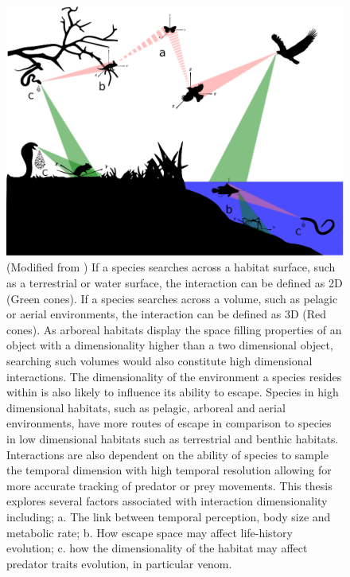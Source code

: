 \begin{figure}[!Hpc]
  \centering
  \includegraphics[keepaspectratio=true, width=1.0\textwidth,left]{ch1-introduction/fig_into.eps}\hspace*{10cm}
  \caption[ ]{(Modified from \cite{pawar2012dimensionality}) If a species searches across a habitat surface, such as a terrestrial or water surface, the interaction can be defined as 2D (Green cones). If a species searches across a volume, such as pelagic or aerial environments, the interaction can be defined as 3D (Red cones). As arboreal habitats display the space filling properties of an object with a dimensionality higher than a two dimensional object, searching such volumes would also constitute high dimensional interactions. The dimensionality of the environment a species resides within is also likely to influence its ability to escape. Species in high dimensional habitats, such as pelagic, arboreal and aerial environments, have more routes of escape in comparison to species in low dimensional habitats such as terrestrial and benthic habitats. Interactions are also dependent on the ability of species to sample the temporal dimension with high temporal resolution allowing for more accurate tracking of predator or prey movements. This thesis explores several factors associated with interaction dimensionality including; a. The link between temporal perception, body size and metabolic rate; b. How escape space may affect life-history evolution; c. how the dimensionality of the habitat may affect predator traits evolution, in particular venom.}
  \label{fig:Figure 1.1}
\end{figure}


